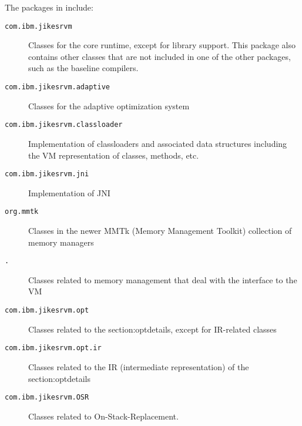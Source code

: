 The packages in \jrvm{} include:
\begin{description}
\item[\texttt{com.ibm.jikesrvm}] Classes for the core runtime, except for library
support.  This package also contains other classes that are not
included in one of the other packages, such as the baseline compilers. 

\item[\texttt{com.ibm.jikesrvm.adaptive}] Classes for the adaptive optimization system

\item[\texttt{com.ibm.jikesrvm.classloader}] Implementation of classloaders
and associated data structures including the VM representation of classes,
methods, etc. 

\item[\texttt{com.ibm.jikesrvm.jni}] Implementation of JNI

\item[\texttt{org.mmtk}] Classes in the newer MMTk
(Memory Management Toolkit) collection of memory managers

\item[\texttt{\MMpackage\-.\mminterface{}}] Classes related to
memory management that deal with the interface to the VM

\item[\texttt{com.ibm.jikesrvm.opt}] Classes related to
the %
{section:optdetails}, except for IR-related classes

\item[\texttt{com.ibm.jikesrvm.opt.ir}] Classes related to the IR
(intermediate representation) of the %
{section:optdetails}

\item[\texttt{com.ibm.jikesrvm.OSR}] Classes related to On-Stack-Replacement. 


\end{description}
